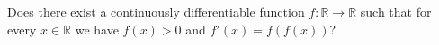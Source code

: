 Does there exist a continuously differentiable function $f : \mathbb{R} \rightarrow \mathbb{R}$ such that for every $x \in \mathbb{R}$ we have $f(x) > 0$ and $f'(x) = f(f(x))$?